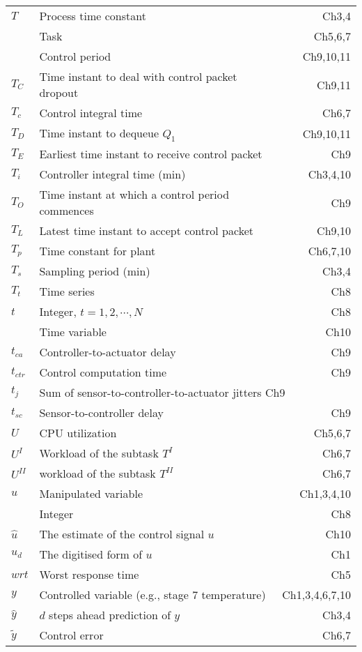 {\begin{longtable}{llr}
{$T  $} & {Process time constant}& Ch3,4\\
			  & Task & Ch5,6,7\\
			  & Control period & Ch9,10,11\\
$T_C$ & Time instant to deal with control packet dropout & Ch9,11\\
$T_c$ & Control integral time & Ch6,7\\
$T_D$ & Time instant to dequeue $Q_1$ & Ch9,10,11\\
$T_E$ & Earliest time instant to receive control packet & Ch9\\
{$T_i$} & {Controller integral time (min)}& Ch3,4,10\\
$T_O$ & Time instant at which a control period commences & Ch9\\
$T_L$ & Latest time instant to accept control packet & Ch9,10\\
$T_p$ & Time constant for plant & Ch6,7,10\\
{$T_s$} & {Sampling period (min)}& Ch3,4\\
$T_t$ & Time series & Ch8\\
$t$ & Integer, $t=1, 2, \cdots, N$ & Ch8\\
    & Time variable & Ch10\\
$t_{ca}$ & Controller-to-actuator delay & Ch9\\
$t_{ctr}$ & Control computation time & Ch9\\
$t_j$ & \multicolumn{2}{l}{Sum of sensor-to-controller-to-actuator jitters \hfill Ch9}\\
$t_{sc}$ & Sensor-to-controller delay & Ch9\\
$U$ & CPU utilization & Ch5,6,7\\
$U^I$ & Workload of the subtask $T^I$ & Ch6,7\\
$U^{II}$ & workload of the subtask $T^{II}$ & Ch6,7\\
{$u$} & {Manipulated variable }& Ch1,3,4,10\\
			& Integer & Ch8\\
$\hat{u}$ & The estimate of the control signal $u$ & Ch10\\		
$u_d$ & The digitised form of $u$ & Ch1\\
$wrt$ & Worst response time & Ch5\\
{$y$} & {Controlled variable (e.g., stage 7 temperature)}& Ch1,3,4,6,7,10\\
{$\hat{y}$} & {$d$ steps ahead prediction of $y$}& Ch3,4\\
$\tilde{y}$ & Control error & Ch6,7\\

\end{longtable}}
